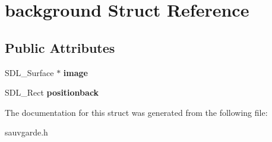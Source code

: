 \hypertarget{structbackground}{}\section{background Struct Reference}
\label{structbackground}
\subsection*{Public Attributes}
\begin{DoxyCompactItemize}
\item 
\mbox{\label{structbackground_a321e7102a3c80e33d40a276f09b8e3f6}} 
S\+D\+L\+\_\+\+Surface $\ast$ {\bfseries image}
\item 
\mbox{\label{structbackground_a0e30e4b18cf776208975409fafd1b698}} 
S\+D\+L\+\_\+\+Rect {\bfseries positionback}
\end{DoxyCompactItemize}


The documentation for this struct was generated from the following file\+:\begin{DoxyCompactItemize}
\item 
sauvgarde.\+h\end{DoxyCompactItemize}
